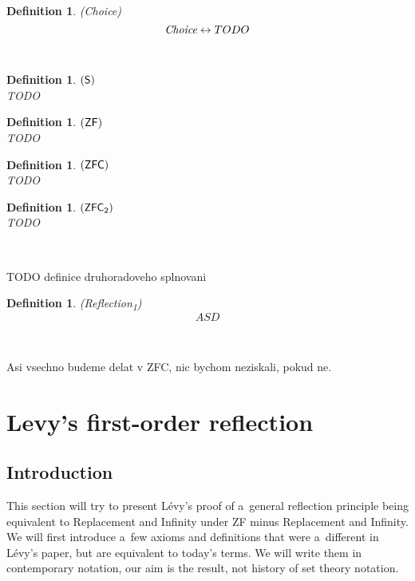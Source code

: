 \documentclass[12pt,a4paper]{article}
\newtheorem{definition}[theorem]{Definition}
\renewcommand{\iff}{\leftrightarrow}
\begin{document}
\begin{definition}{(\emph{Choice})}\label{def:choice}\\
\begin{equation}
\emph{Choice} \iff TODO
\end{equation}
\end{definition}

\

\begin{definition}{$(\sf{S})$}\label{def:s}\\
TODO
\end{definition}

\begin{definition}{$(\sf{ZF})$}\label{def:zf}\\
TODO
\end{definition}

\begin{definition}{$(\sf{ZFC})$}\label{def:zfc}\\
TODO
\end{definition}

\begin{definition}{$(\sf{ZFC\textsubscript{2}})$}\label{def:zfc_2}\\
TODO
\end{definition}

\

TODO definice druhoradoveho splnovani


\begin{definition}{(\emph{Reflection\textsubscript{1}})}\label{def:reflection_1}\\
\begin{equation}
ASD
\end{equation}
\end{definition}
\

Asi vsechno budeme delat v ZFC, nic bychom neziskali, pokud ne.

\newpage
\section{Levy's first-order reflection}\label{sec:fixed}

\subsection{Introduction}
This section will try to present Lévy's proof of a~general reflection principle being equivalent to Replacement and Infinity under ZF minus Replacement and Infinity.
We will first introduce a~few axioms and definitions that were a~different in Lévy's paper\cite{Levy60a}, but are equivalent to today's terms. We will write them in contemporary notation, our aim is the result, not history of set theory notation. 
\end{document}

